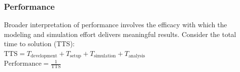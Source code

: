 \documentclass{beamer}
\begin{document}
\begin{frame}\frametitle{Performance}
\begin{center}
Broader interpretation of performance involves the efficacy with which the modeling and simulation effort delivers meaningful results. Consider the total time to solution (TTS):\\
\vspace{40pt}
$\text{TTS} = T_\text{development} + T_\text{setup} + T_\text{simulation} + T_\text{analysis}$\\ 
\vspace{20pt}
$\text{Performance} = \frac{1}{\text{TTS}}$
\end{center}
\end{frame}
\end{document}
